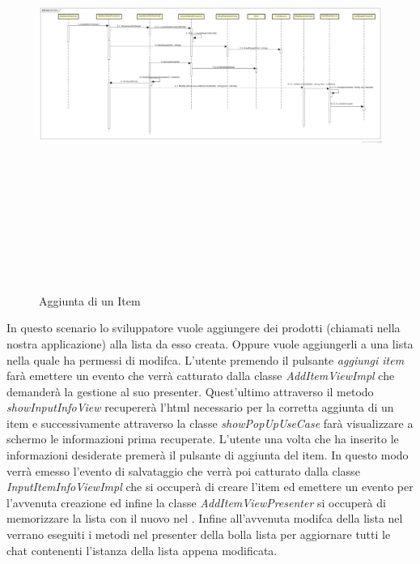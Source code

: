 \label{Aggiunta di un Item}
\begin{figure}[H]
	\centering
	\includegraphics[width=16cm, height=14cm]{Sezioni/Diagrammi/img_app/aggiunta_item.jpg}
	\caption{Aggiunta di un Item}
\end{figure}

In questo scenario lo sviluppatore vuole aggiungere dei prodotti (chiamati  nella nostra applicazione) alla lista da esso creata. Oppure vuole aggiungerli a una lista nella quale ha permessi di modifca. L'utente premendo il pulsante \textit{aggiungi item} farà emettere un evento che verrà catturato dalla classe \textit{AddItemViewImpl} che demanderà la gestione al suo presenter. Quest'ultimo attraverso il metodo \textit{showInputInfoView} recupererà l'html necessario per la corretta aggiunta di un item e successivamente attraverso la classe \textit{showPopUpUseCase} farà visualizzare a schermo le informazioni prima recuperate. L'utente una volta che ha inserito le informazioni desiderate premerà il pulsante di aggiunta del item. In questo modo verrà emesso l'evento di salvataggio che verrà poi catturato dalla classe \textit{InputItemInfoViewImpl} che si occuperà di creare l'item ed emettere un evento per l'avvenuta creazione ed infine la classe \textit{AddItemViewPresenter} si occuperà di memorizzare la  lista con il nuovo  nel . Infine all'avvenuta modifca della lista nel  verrano eseguiti i metodi nel presenter della bolla lista per aggiornare tutti le chat contenenti l'istanza della lista appena modificata. 





